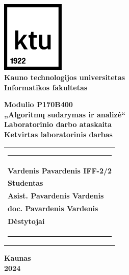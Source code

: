 \begin{titlepage}

\newcommand{\universitetas}{Kauno technologijos universitetas}
\newcommand{\fakultetas}{Informatikos fakultetas}
\newcommand{\modulioKodas}{Modulio P170B400}
\newcommand{\pavadinimas}{„Algoritmų sudarymas ir analizė“}
\newcommand{\darboTipas}{Laboratorinio darbo ataskaita}
\newcommand{\laboratorinisDarbas}{Ketvirtas laboratorinis darbas}
\newcommand{\autorius}{Vardenis Pavardenis IFF-2/2}
\newcommand{\statusas}{Studentas}
\newcommand{\destytojasOne}{Asist. Pavardenis Vardenis}
\newcommand{\destytojasTwo}{doc. Pavardenis Vardenis}
\newcommand{\destytojai}{Dėstytojai}
\newcommand{\miestas}{Kaunas}
\newcommand{\metai}{2024}

\renewcommand{\headrulewidth}{0pt}

\onehalfspacing
\center
\includegraphics[width=30mm]{KTU logotype_RGB_without text_BLACK} \\ [5mm]
\textbf{\universitetas} \\ [5mm]
\textbf{\fakultetas} \vfill

\textbf{\modulioKodas} \\ [5mm]
\LARGE\textbf{\pavadinimas} \\ [10mm]
\normalsize\textbf{\darboTipas} \\ [5mm]
\textbf{\laboratorinisDarbas} \vfill

\begin{flushright}
\begin{tabular}{l}
\rule{0.9\textwidth}{0.4pt} \\ [0.5cm]
\textbf{\autorius} \\ [5pt]
\textbf{\statusas} \\ [15pt]
\textbf{\destytojasOne} \\ [5pt]
\textbf{\destytojasTwo} \\ [5pt]
\textbf{\destytojai} \\ [1.5cm]
\rule{0.9\textwidth}{0.4pt}
\end{tabular}
\end{flushright}

\vfill
\center
\textbf{\miestas} \\
\textbf{\metai}

\end{titlepage}
